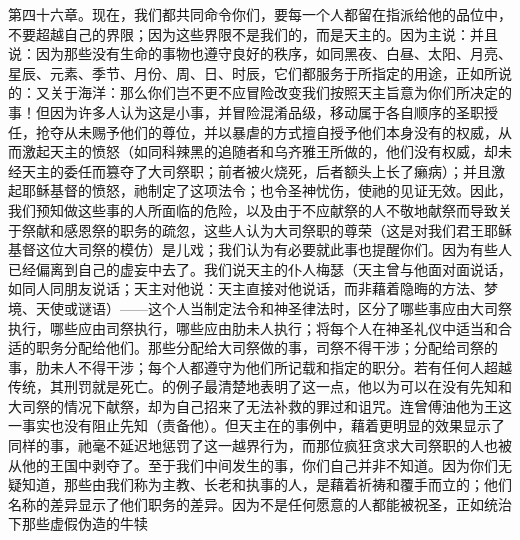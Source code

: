第四十六章。现在，我们都共同命令你们，要每一个人都留在指派给他的品位中，不要超越自己的界限；因为这些界限不是我们的，而是天主的。因为主说：并且说：因为那些没有生命的事物也遵守良好的秩序，如同黑夜、白昼、太阳、月亮、星辰、元素、季节、月份、周、日、时辰，它们都服务于所指定的用途，正如所说的：又关于海洋：那么你们岂不更不应冒险改变我们按照天主旨意为你们所决定的事！但因为许多人认为这是小事，并冒险混淆品级，移动属于各自顺序的圣职授任，抢夺从未赐予他们的尊位，并以暴虐的方式擅自授予他们本身没有的权威，从而激起天主的愤怒（如同科辣黑的追随者和乌齐雅王所做的，他们没有权威，却未经天主的委任而篡夺了大司祭职；前者被火烧死，后者额头上长了癞病）；并且激起耶稣基督的愤怒，祂制定了这项法令；也令圣神忧伤，使祂的见证无效。因此，我们预知做这些事的人所面临的危险，以及由于不应献祭的人不敬地献祭而导致关于祭献和感恩祭的职务的疏忽，这些人认为大司祭职的尊荣（这是对我们君王耶稣基督这位大司祭的模仿）是儿戏；我们认为有必要就此事也提醒你们。因为有些人已经偏离到自己的虚妄中去了。我们说天主的仆人梅瑟（天主曾与他面对面说话，如同人同朋友说话；天主对他说：天主直接对他说话，而非藉着隐晦的方法、梦境、天使或谜语）——这个人当制定法令和神圣律法时，区分了哪些事应由大司祭执行，哪些应由司祭执行，哪些应由肋未人执行；将每个人在神圣礼仪中适当和合适的职务分配给他们。那些分配给大司祭做的事，司祭不得干涉；分配给司祭的事，肋未人不得干涉；每个人都遵守为他们所记载和指定的职分。若有任何人超越传统，其刑罚就是死亡。的例子最清楚地表明了这一点，他以为可以在没有先知和大司祭的情况下献祭，却为自己招来了无法补救的罪过和诅咒。连曾傅油他为王这一事实也没有阻止先知（责备他）。但天主在的事例中，藉着更明显的效果显示了同样的事，祂毫不延迟地惩罚了这一越界行为，而那位疯狂贪求大司祭职的人也被从他的王国中剥夺了。至于我们中间发生的事，你们自己并非不知道。因为你们无疑知道，那些由我们称为主教、长老和执事的人，是藉着祈祷和覆手而立的；他们名称的差异显示了他们职务的差异。因为不是任何愿意的人都能被祝圣，正如统治下那些虚假伪造的牛犊